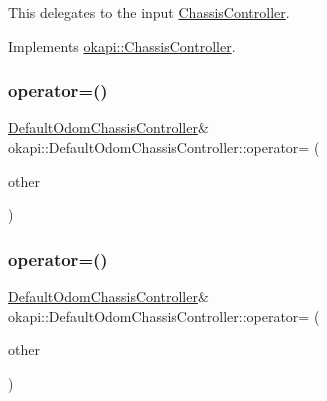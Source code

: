 This delegates to the input \mbox{\hyperlink{classokapi_1_1ChassisController}{Chassis\+Controller}}. 

Implements \mbox{\hyperlink{classokapi_1_1ChassisController_a24b46ec1c42f32c0527d57738a07820a}{okapi\+::\+Chassis\+Controller}}.

\mbox{\label{classokapi_1_1DefaultOdomChassisController_a1afd04cb4449601d959bcdc7d03091ae}} 
\subsubsection{\texorpdfstring{operator=()}{operator=()}\hspace{0.1cm}{\footnotesize\ttfamily [1/2]}}
{\footnotesize\ttfamily \mbox{\hyperlink{classokapi_1_1DefaultOdomChassisController}{Default\+Odom\+Chassis\+Controller}}\& okapi\+::\+Default\+Odom\+Chassis\+Controller\+::operator= (\begin{DoxyParamCaption}\item[{const \mbox{\hyperlink{classokapi_1_1DefaultOdomChassisController}{Default\+Odom\+Chassis\+Controller}} \&}]{other }\end{DoxyParamCaption})\hspace{0.3cm}{\ttfamily [delete]}}

\mbox{\label{classokapi_1_1DefaultOdomChassisController_ab8d67b8e5ded9fb80dd7538f96fe7e59}} 
\subsubsection{\texorpdfstring{operator=()}{operator=()}\hspace{0.1cm}{\footnotesize\ttfamily [2/2]}}
{\footnotesize\ttfamily \mbox{\hyperlink{classokapi_1_1DefaultOdomChassisController}{Default\+Odom\+Chassis\+Controller}}\& okapi\+::\+Default\+Odom\+Chassis\+Controller\+::operator= (\begin{DoxyParamCaption}\item[{\mbox{\hyperlink{classokapi_1_1DefaultOdomChassisController}{Default\+Odom\+Chassis\+Controller}} \&\&}]{other }\end{DoxyParamCaption})\hspace{0.3cm}{\ttfamily [delete]}}

